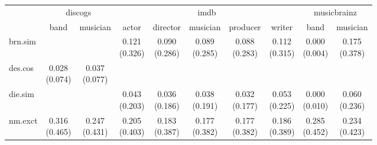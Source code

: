 \documentclass[epsfig,a4paper,11pt,titlepage,twoside,openany]{book}
\begin{document}
\begin{table}[h]
\centering
\begin{tabular}{l|c|c|c|c|c|c|c|c|c|}
\cline{2-10}
                                                           & \multicolumn{2}{c|}{discogs} & \multicolumn{5}{c|}{imdb}                                                & \multicolumn{2}{c|}{musicbrainz} \\ \cline{2-10} 
                                                           & band          & musician     & actor        & director     & musician     & producer     & writer       & band            & musician       \\ \hline
\multicolumn{1}{|l|}{brn.sim}                        &               &              & \makecell{0.121 \\ (0.326)} & \makecell{0.090 \\ (0.286)} & \makecell{0.089 \\ (0.285)} & \makecell{0.088 \\ (0.283)} & \makecell{0.112 \\ (0.315)} & \makecell{0.000 \\ (0.004)}    & \makecell{0.175 \\ (0.378)}   \\ \hline
\multicolumn{1}{|l|}{des.cos}                  & \makecell{0.028 \\ (0.074)}  & \makecell{0.037 \\ (0.077)} &              &              &              &              &              &                 &                \\ \hline
\multicolumn{1}{|l|}{die.sim}                        &               &              & \makecell{0.043 \\ (0.203)} & \makecell{0.036 \\ (0.186)} & \makecell{0.038 \\ (0.191)} & \makecell{0.032 \\ (0.177)} & \makecell{0.053 \\ (0.225)} & \makecell{0.000 \\ (0.010)}    & \makecell{0.060 \\ (0.236)}   \\ \hline
\multicolumn{1}{|l|}{nm.exct}                          & \makecell{0.316 \\ (0.465)}  & \makecell{0.247 \\ (0.431)} & \makecell{0.205 \\ (0.403)} & \makecell{0.183 \\ (0.387)} & \makecell{0.177 \\ (0.382)} & \makecell{0.177 \\ (0.382)} & \makecell{0.186 \\ (0.389)} & \makecell{0.285 \\ (0.452)}    & \makecell{0.234 \\ (0.423)}   \\ \hline

\end{tabular}
\end{table}
\end{document}
